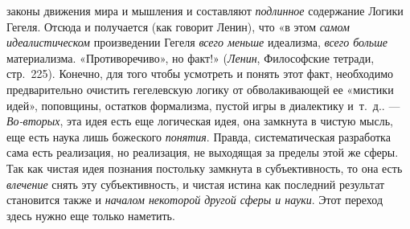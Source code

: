 \documentclass[twoside]{article}
\begin{document}
{{{законы движения мира и мышления и составляют {\em подлинное}
содержание Логики Гегеля. Отсюда и получается (как говорит
Ленин), что «в этом {\em самом идеалистическом} произведении Гегеля
{\em всего меньше} идеализма, {\em всего больше} материализма. 
«Противоречиво», но факт!» ({\em Ленин},
Философские тетради, стр.~225). Конечно, для того чтобы
усмотреть и понять этот факт, необходимо предварительно очистить
гегелевскую логику от обволакивающей ее «мистики идей», поповщины, остатков
формализма, пустой игры в диалектику и~т.~д.}\label{bkm:bm131}.
— {\em Во-вторых},
эта идея есть еще логическая идея, она замкнута в чистую
мысль, еще есть наука лишь божеского
{\em понятия}. Правда,
систематическая разработка сама есть реализация, но реализация, не
выходящая за пределы этой же сферы. Так как чистая идея познания постольку
замкнута в субъективность, то она есть
{\em влечение} снять эту
субъективность, и чистая истина как последний результат становится также и
{\em началом некоторой другой сферы и
науки}. Этот переход здесь нужно еще только наметить.

}}
\end{document}

